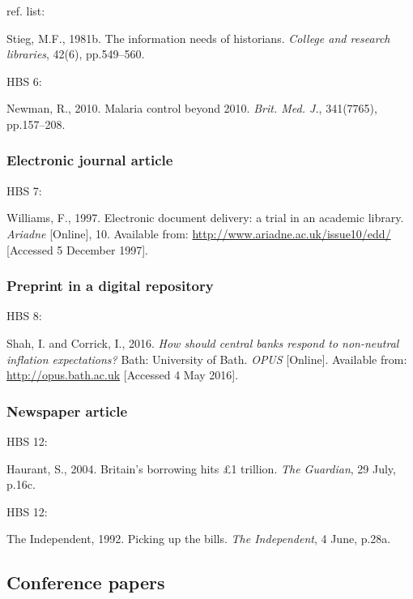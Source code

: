 ref. list: \cite{stieg1981inh}

Stieg, M.F., 1981b. The information needs of historians. \emph{College and research libraries}, 42(6), pp.549--560.


HBS 6: \cite{newman2010mcb}

Newman, R., 2010. Malaria control beyond 2010. \emph{Brit. Med. J.}, 341(7765), pp.157--208.



\subsubsection*{Electronic journal article}

HBS 7: \cite{williams1997edd}

Williams, F., 1997. Electronic document delivery: a trial in an academic library. \emph{Ariadne} [Online], 10. Available from: \url{http://www.ariadne.ac.uk/issue10/edd/} [Accessed 5 December 1997].



\subsubsection*{Preprint in a digital repository}

HBS 8: \cite{shah.corrick2016hsc}

Shah, I. and Corrick, I., 2016. \emph{How should central banks respond to non-neutral inflation expectations?} Bath: University of Bath. \emph{OPUS} [Online]. Available from: \url{http://opus.bath.ac.uk} [Accessed 4 May 2016].



\subsubsection*{Newspaper article}

HBS 12: \cite{haurant2004bbh}

Haurant, S., 2004. Britain's borrowing hits £1 trillion. \emph{The Guardian}, 29 July, p.16c.


HBS 12: \cite{independent1992pub}

The Independent, 1992. Picking up the bills. \emph{The Independent}, 4 June, p.28a.



\subsection{Conference papers}


